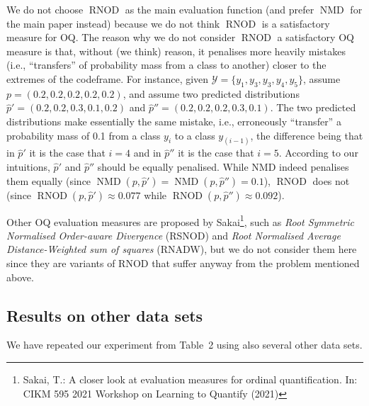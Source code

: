 \documentclass[10pt,a4paper]{article}
\DeclareMathOperator{\nmd}{NMD}
\DeclareMathOperator{\rnod}{RNOD}
\begin{document}
We do not choose $\rnod$ as the main evaluation function (and prefer
$\nmd$ for the main paper instead) because we do not think $\rnod$ is
a satisfactory measure for OQ. The reason why we do not consider
$\rnod$ a satisfactory OQ measure is that, without (we think) reason,
it penalises more heavily mistakes (i.e., ``transfers'' of probability
mass from a class to another) closer to the extremes of the
codeframe. For instance, given
$\mathcal{Y}=\{y_{1},y_{3},y_{3}, y_{4},y_{5}\}$, assume
$p=(0.2,0.2,0.2,0.2,0.2)$, and assume two predicted distributions
$\hat{p}'=(0.2,0.2,0.3,0.1,0.2)$ and
$\hat{p}''=(0.2,0.2,0.2,0.3,0.1)$. The two predicted distributions
make essentially the same mistake, i.e., erroneously ``transfer'' a
probability mass of 0.1 from a class $y_{i}$ to a class $y_{(i-1)}$,
the difference being that in $\hat{p}'$ it is the case that $i=4$ and
in $\hat{p}''$ it is the case that $i=5$. According to our intuitions,
$\hat{p}'$ and $\hat{p}''$ should be equally penalised. While NMD
indeed penalises them equally (since
$\nmd(p,\hat{p}')=\nmd(p,\hat{p}'')=0.1$), $\rnod$ does not (since
$\rnod(p,\hat{p}')\approx 0.077$ while
$\rnod(p,\hat{p}'')\approx 0.092$). %

Other OQ evaluation measures are proposed by Sakai\footnote{Sakai, T.: A closer look at evaluation measures for ordinal quantification. In: CIKM 595
2021 Workshop on Learning to Quantify (2021)}, such
as \emph{Root Symmetric Normalised Order-aware Divergence} (RSNOD) and
\emph{Root Normalised Average Distance-Weighted sum of squares}
(RNADW), but we do not consider them here since they are variants of
RNOD that suffer anyway from the problem mentioned above.


\subsection{Results on other data sets}

\noindent We have repeated our experiment from Table~2 using also several
other data sets.
\end{document}
